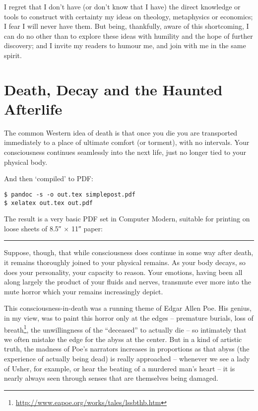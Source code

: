 \documentclass[english,showtrims, 10pt]{memoir}
\renewcommand{\href}[2]{#2\footnote{\raggedright\url{#1}}}
\newcommand{\setChapterDescription}[1]{%
   \def\chapterDesc{#1}%
}
\def\chapterDesc{}
\newcommand{\ChapterDate}[2]{
	\setChapterDescription{#2}
	\chapter{#1}
	\setChapterDescription{}
}
\begin{document}
I regret that I don't have (or don't know that I have) the direct
knowledge or tools to construct with certainty my ideas on theology,
metaphysics or economics; I fear I will never have them. But being,
thankfully, aware of this shortcoming, I can do no other than to explore
these ideas with humility and the hope of further discovery; and I
invite my readers to humour me, and join with me in the same spirit.

\ChapterDate{Death, Decay and the Haunted Afterlife}{October 26, 2014}

{The common} Western idea of death is that once you die you are
transported immediately to a place of ultimate comfort (or torment),
with no intervals. Your consciousness continues seamlessly into the next
life, just no longer tied to your physical body.

And then `compiled' to {PDF}:

\begin{verbatim}
$ pandoc -s -o out.tex simplepost.pdf
$ xelatex out.tex out.pdf
\end{verbatim}

The result is a very basic {PDF} set in Computer Modern, suitable for
printing on loose sheets of 8.5″ × 11″ paper:

\begin{center}\rule{0.5\linewidth}{\linethickness}\end{center}

Suppose, though, that while consciousness does continue in some way
after death, it remains thoroughly joined to your physical remains. As
your body decays, so does your personality, your capacity to reason.
Your emotions, having been all along largely the product of your fluids
and nerves, transmute ever more into the mute horror which your remains
increasingly depict.

This consciousness-in-death was a running theme of Edgar Allen Poe. His
genius, in my view, was to paint this horror only at the edges --
premature burials,
\href{http://www.eapoe.org/works/tales/lssbthb.htm}{loss of breath}, the
unwillingness of the ``deceased'' to actually die -- so intimately that
we often mistake the edge for the abyss at the center. But in a kind of
artistic truth, the madness of Poe's narrators increases in proportions
as that abyss (the experience of actually being dead) is really
approached -- whenever we see a lady of Usher, for example, or hear the
beating of a murdered man's heart -- it is nearly always seen through
senses that are themselves being damaged.
\end{document}
